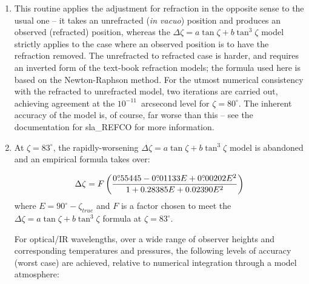 \documentclass[11pt,twoside]{article}
\begin{document}
{
 \begin{enumerate}
  \item This routine applies the adjustment for refraction in the
        opposite sense to the usual one -- it takes an unrefracted
        ({\it in vacuo}\/) position and produces an observed (refracted)
        position, whereas the
        $\Delta \zeta = a \tan \zeta + b \tan^{3} \zeta$
        model strictly
        applies to the case where an observed position is to have the
        refraction removed.  The unrefracted to refracted case is
        harder, and requires an inverted form of the text-book
        refraction models;  the formula used here is based on the
        Newton-Raphson method.  For the utmost numerical consistency
        with the refracted to unrefracted model, two iterations are
        carried out, achieving agreement at the $10^{-11}$~arcsecond level
        for $\zeta=80^\circ$.  The inherent accuracy of the model
        is, of course, far worse than this -- see the documentation for
        sla\_REFCO for more information.
  \item At $\zeta=83^\circ$, the rapidly-worsening
        $\Delta \zeta = a \tan \zeta + b \tan^{3} \zeta$
        model is abandoned and an empirical formula takes over:

          \[\Delta \zeta = F \left(
  \frac{0^\circ\hspace{-0.37em}.\hspace{0.02em}55445
                - 0^\circ\hspace{-0.37em}.\hspace{0.02em}01133 E
                          + 0^\circ\hspace{-0.37em}.\hspace{0.02em}00202 E^2}
             {1 + 0.28385 E +0.02390 E^2} \right) \]
        where $E=90^\circ-\zeta_{true}$
        and $F$ is a factor chosen to meet the
        $\Delta \zeta = a \tan \zeta + b \tan^{3} \zeta$
        formula at $\zeta=83^\circ$.

        For optical/IR wavelengths, over a wide range of observer heights
        and corresponding temperatures and pressures, the following levels
        of accuracy (worst case) are achieved,
        relative to numerical integration through a model atmosphere:


\end{enumerate}}
\end{document}
